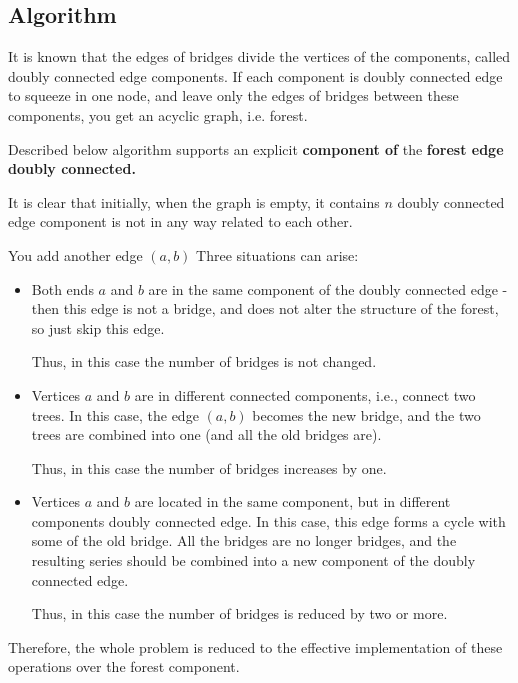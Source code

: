 \subsection{ Algorithm }

It is known that the edges of bridges divide the vertices of the components, called doubly connected edge components. If each component is doubly connected edge to squeeze in one node, and leave only the edges of bridges between these components, you get an acyclic graph, i.e. forest.

Described below algorithm supports an explicit \textbf{component of} the \textbf{forest edge doubly connected.}

It is clear that initially, when the graph is empty, it contains $n$ doubly connected edge component is not in any way related to each other.

You add another edge $(a, b)$ Three situations can arise:

\begin{itemize}

\item Both ends $a$ and $b$ are in the same component of the doubly connected edge - then this edge is not a bridge, and does not alter the structure of the forest, so just skip this edge.

Thus, in this case the number of bridges is not changed.

\item Vertices $a$ and $b$ are in different connected components, i.e., connect two trees. In this case, the edge $(a, b)$ becomes the new bridge, and the two trees are combined into one (and all the old bridges are).

Thus, in this case the number of bridges increases by one.

\item Vertices $a$ and $b$ are located in the same component, but in different components doubly connected edge. In this case, this edge forms a cycle with some of the old bridge. All the bridges are no longer bridges, and the resulting series should be combined into a new component of the doubly connected edge.

Thus, in this case the number of bridges is reduced by two or more.

\end{itemize}

Therefore, the whole problem is reduced to the effective implementation of these operations over the forest component.

